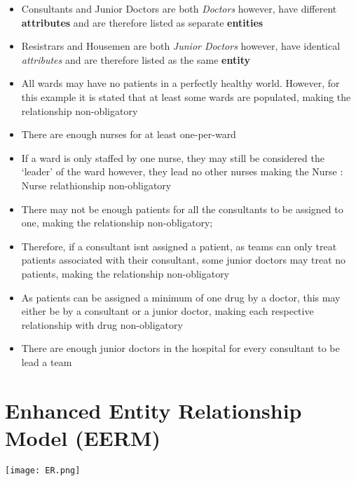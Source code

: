 \documentclass[11pt, english]{article}
\begin{document}
	\begin{itemize}
	\setlength\itemsep{0cm}
		\item Consultants and Junior Doctors are both \textit{Doctors} however, have different \textbf{attributes} and are therefore listed as separate \textbf{entities}
		\item Resistrars and Housemen are both \textit{Junior Doctors} however, have identical \textit{attributes} and are therefore listed as the same \textbf{entity}
		\item All wards may have no patients in a perfectly healthy world. However, for this example it is stated that at least some wards are populated, making the relationship non-obligatory
		\item There are enough nurses for at least one-per-ward
		\item If a ward is only staffed by one nurse, they may still be considered the `leader' of the ward however, they lead no other nurses making the Nurse : Nurse relathionship non-obligatory
		\item There may not be enough patients for all the consultants to be assigned to one, making the relationship non-obligatory;
		\item Therefore, if a consultant isnt assigned a patient, as teams can only treat patients associated with their consultant, some junior doctors may treat no patients, making the relationship non-obligatory
		\item As patients can be assigned a minimum of one drug by a doctor, this may either be by a consultant or a junior doctor, making each respective relationship with drug non-obligatory
		\item There are enough junior doctors in the hospital for every consultant to be lead a team
	\end{itemize}

\newpage

\section{Enhanced Entity Relationship Model (EERM)}

	\vspace{\fill}

	\begin{center}
		\texttt{[image: ER.png]}
	\end{center}

	\vspace{\fill}
\end{document}
